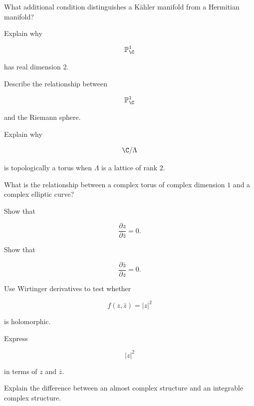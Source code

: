 \begin{exercise}[2]
What additional condition distinguishes a K\"ahler manifold from a Hermitian
manifold?
\end{exercise}

\begin{exercise}[2]
Explain why

\[
\mathbb{P}^1_{\C}
\]

has real dimension \(2\).
\end{exercise}

\begin{exercise}[2]
Describe the relationship between

\[
\mathbb{P}^1_{\C}
\]

and the Riemann sphere.
\end{exercise}

\begin{exercise}[2]
Explain why

\[
\C/\Lambda
\]

is topologically a torus when \(\Lambda\) is a lattice of rank \(2\).
\end{exercise}

\begin{exercise}[2]
What is the relationship between a complex torus of complex dimension \(1\)
and a complex elliptic curve?
\end{exercise}

\begin{exercise}[3]
Show that

\[
\frac{\partial z}{\partial\bar z}=0.
\]
\end{exercise}

\begin{exercise}[3]
Show that

\[
\frac{\partial\bar z}{\partial z}=0.
\]
\end{exercise}

\begin{exercise}[3]
Use Wirtinger derivatives to test whether

\[
f(z,\bar z)=|z|^2
\]

is holomorphic.
\end{exercise}

\begin{exercise}[3]
Express

\[
|z|^2
\]

in terms of \(z\) and \(\bar z\).
\end{exercise}

\begin{exercise}[3]
Explain the difference between an almost complex structure and an integrable
complex structure.
\end{exercise}

